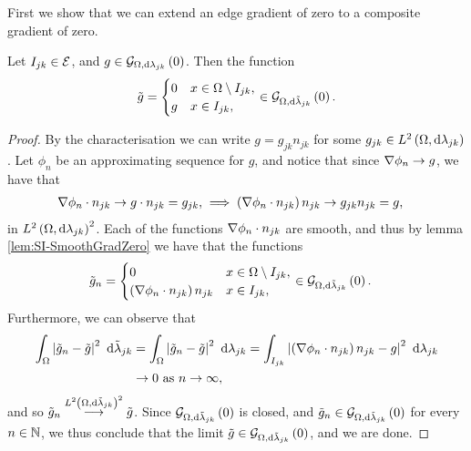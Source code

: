 First we show that we can extend an edge gradient of zero to a composite gradient of zero.
\begin{lemma} \label{lem:SI-GradZeroEdgeToComposite}
	Let $I_{jk}\in\mathcal{E}$, and $g\in\mathcal{G}_{ \Omega, \mathrm{d}\lambda_{jk}}\left( 0 \right)$.
	Then the function
	\begin{align*}
		\tilde{g} = \begin{cases} 0 & x\in\Omega\setminus I_{jk}, \\ g & x\in I_{jk}, \end{cases}
		\in\mathcal{G}_{ \Omega, \mathrm{d}\tilde{\lambda}_{jk}}\left( 0 \right).
	\end{align*}
\end{lemma}
\begin{proof}
	By the characterisation  we can write $g = g_{jk}n_{jk}$ for some $g_{jk}\in L^{2}\left( \Omega,\mathrm{d}\lambda_{jk} \right)$.
	Let $\phi_n$ be an approximating sequence for $g$, and notice that since $\nabla\phi_n\rightarrow g$, we have that
	\begin{align*}
		\nabla\phi_n\cdot n_{jk} \rightarrow g\cdot n_{jk} = g_{jk}, 
		&\implies
		\left(  \nabla\phi_n\cdot n_{jk}  \right)n_{jk} \rightarrow g_{jk}n_{jk} = g,
	\end{align*}
	in $L^{2}\left( \Omega,\mathrm{d}\lambda_{jk} \right)^2$.
	Each of the functions $\nabla\phi_n\cdot n_{jk}$ are smooth, and thus by lemma \ref{lem:SI-SmoothGradZero} we have that the functions
	\begin{align*}
		\tilde{g}_n &= \begin{cases} 0 & x\in\Omega\setminus I_{jk}, \\ \left(  \nabla\phi_n\cdot n_{jk}  \right)n_{jk} & x\in I_{jk}, \end{cases}
		\in\mathcal{G}_{ \Omega, \mathrm{d}\tilde{\lambda}_{jk}}\left( 0 \right).
	\end{align*}
	Furthermore, we can observe that
	\begin{align*}
		\int_{\Omega}\left\lvert  \tilde{g}_n - \tilde{g}  \right\rvert^2 \ \mathrm{d}\tilde{\lambda}_{jk}
		&= \int_{\Omega}\left\lvert  \tilde{g}_n - \tilde{g}  \right\rvert^2 \ \mathrm{d}\lambda_{jk}
		= \int_{I_{jk}}\left\lvert  \left(  \nabla\phi_n\cdot n_{jk}  \right)n_{jk} - g  \right\rvert^2 \ \mathrm{d}\lambda_{jk} \\
		&\rightarrow 0 \ \text{as} \ n \rightarrow\infty,
	\end{align*}
	and so $\tilde{g}_n\overset{L^{2}\left( \Omega,\mathrm{d}\tilde{\lambda}_{jk} \right)^2}{\longrightarrow}\tilde{g}$.
	Since $\mathcal{G}_{ \Omega, \mathrm{d}\tilde{\lambda}_{jk}}\left( 0 \right)$ is closed, and $\tilde{g}_n\in\mathcal{G}_{ \Omega, \mathrm{d}\tilde{\lambda}_{jk}}\left( 0 \right)$ for every $n\in\mathbb{N}$, we thus conclude that the limit $\tilde{g}\in\mathcal{G}_{ \Omega, \mathrm{d}\tilde{\lambda}_{jk}}\left( 0 \right)$, and we are done.
\end{proof}

